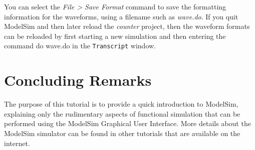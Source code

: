 \documentclass[11pt, twoside, pdftex]{article}
\newcommand{\commonPath}{../../../Common}
\begin{document}
You can select the {\it File > Save Format} command to save the formatting information for the waveforms,
using a filename such as {\it wave.do}. If you quit ModelSim and then later reload the {\it counter} project,
then the waveform formats can be reloaded by first starting a new simulation and then entering the command 
{\sf do wave.do} in the \texttt{Transcript} window.

\section{Concluding Remarks}

The purpose of this tutorial is to provide a quick introduction to ModelSim, explaining only
the rudimentary aspects of functional simulation that can be performed using the ModelSim
Graphical User Interface. More details about the ModelSim simulator can be found in other 
tutorials that are available on the internet.



\end{document}
